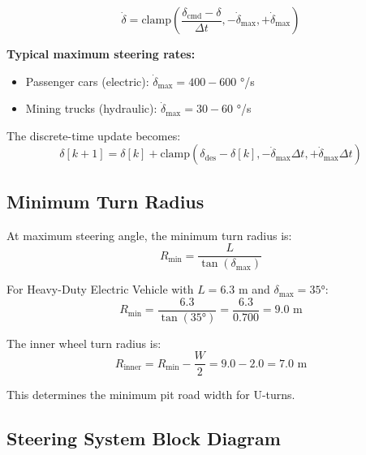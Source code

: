 \documentclass[11pt,a4paper]{article}
\begin{document}
\begin{equation}
\boxed{\dot{\delta} = \text{clamp}\left(\frac{\delta_{\text{cmd}} - \delta}{\Delta t}, -\dot{\delta}_{\max}, +\dot{\delta}_{\max}\right)}
\label{eq:rate_limit}
\end{equation}

\textbf{Typical maximum steering rates:}
\begin{itemize}
    \item Passenger cars (electric): $\dot{\delta}_{\max} = 400 - 600$ °/s
    \item Mining trucks (hydraulic): $\dot{\delta}_{\max} = 30 - 60$ °/s
\end{itemize}

The discrete-time update becomes:
\begin{equation}
\delta[k+1] = \delta[k] + \text{clamp}\left(\delta_{\text{des}} - \delta[k], -\dot{\delta}_{\max} \Delta t, +\dot{\delta}_{\max} \Delta t\right)
\end{equation}

\subsection{Minimum Turn Radius}

At maximum steering angle, the minimum turn radius is:
\begin{equation}
R_{\min} = \frac{L}{\tan(\delta_{\max})}
\end{equation}

For Heavy-Duty Electric Vehicle with $L = 6.3$ m and $\delta_{\max} = 35°$:
\begin{equation}
R_{\min} = \frac{6.3}{\tan(35°)} = \frac{6.3}{0.700} = 9.0 \text{ m}
\end{equation}

The inner wheel turn radius is:
\begin{equation}
R_{\text{inner}} = R_{\min} - \frac{W}{2} = 9.0 - 2.0 = 7.0 \text{ m}
\end{equation}

This determines the minimum pit road width for U-turns.

\subsection{Steering System Block Diagram}
\end{document}
